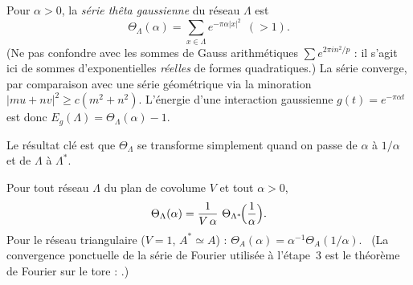 Pour $\alpha>0$, la \emph{série thêta gaussienne} du réseau $\Lambda$ est
\[
  \Theta_\Lambda(\alpha)=\sum_{x\in\Lambda}e^{-\pi\alpha|x|^2}\ \ (>1).
\]
(Ne pas confondre avec les sommes de Gauss arithmétiques $\sum e^{2\pi i n^2/p}$ : il s'agit ici de sommes d'exponentielles
\emph{réelles} de formes quadratiques.) La série converge, par comparaison avec une série géométrique via la minoration
$|mu+nv|^2\ge c(m^2+n^2)$. L'énergie d'une interaction gaussienne $g(t)=e^{-\pi\alpha t}$ est donc
$E_g(\Lambda)=\Theta_\Lambda(\alpha)-1$.

Le résultat clé est que $\Theta_\Lambda$ se transforme simplement quand on passe de $\alpha$ à $1/\alpha$ et de $\Lambda$ à $\Lambda^*$.

\begin{theorem}\label{ch1:thm:poisson}
Pour tout réseau $\Lambda$ du plan de covolume $V$ et tout $\alpha>0$,
\[
  \Theta_\Lambda(\alpha)=\frac{1}{V\,\alpha}\ \Theta_{\Lambda^*}\!\Bigl(\frac1\alpha\Bigr).
\]
Pour le réseau triangulaire ($V=1$, $A^*\simeq A$) : $\Theta_A(\alpha)=\alpha^{-1}\Theta_A(1/\alpha)$. \tierC{}\
(La convergence ponctuelle de la série de Fourier utilisée à l'étape~3 est le théorème de Fourier sur le tore : \tierL{}.)
\end{theorem}

